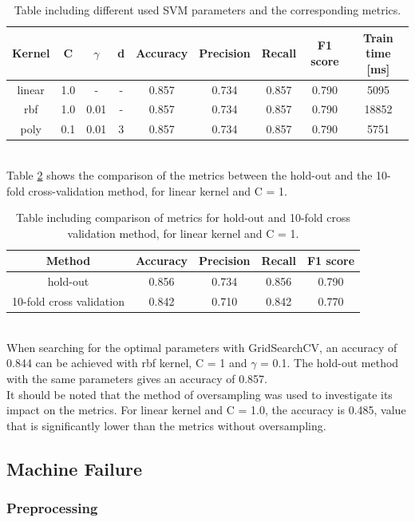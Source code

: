 \documentclass{article}
\begin{document}
\begin{table}[h!]
\centering
\begin{tabular}{||c c c c c c c c c||} 
 \hline
 Kernel & C & $\gamma$ &d & Accuracy & Precision & Recall & F1 score & Train time [ms] \\ [0.5ex] 
 \hline\hline
 linear &  1.0 & - & - & 0.857 & 0.734 & 0.857 & 0.790 & 5095 \\
  rbf &  1.0 & 0.01 & - & 0.857 & 0.734 & 0.857 & 0.790 & 18852\\
 poly &  0.1 & 0.01 & 3 & 0.857 & 0.734 & 0.857 & 0.790 & 5751 \\[1ex] 
 \hline
\end{tabular}
\caption{Table including different used SVM parameters and the corresponding metrics.}
\label{table:rta_SVM}
\end{table}
\\
Table \ref{table:rta_SVM_cross} shows the comparison of the metrics between the hold-out and the 10-fold cross-validation method, for linear kernel and C = 1.
\begin{table}[h!]
\centering
\begin{tabular}{||c c c c c||} 
 \hline
Method &  Accuracy & Precision & Recall & F1 score \\ [0.5ex] 
 \hline\hline
hold-out & 0.856 & 0.734 & 0.856 & 0.790  \\  
 10-fold cross validation &  0.842&  0.710 & 0.842& 0.770 \\ [1ex] 
 \hline
\end{tabular}
\caption{Table including comparison of metrics for hold-out and 10-fold cross validation method, for linear kernel and C = 1.}
\label{table:rta_SVM_cross}
\end{table}
\\ 
When searching for the optimal parameters with GridSearchCV, an accuracy of 0.844 can be achieved with rbf kernel, C = 1 and $\gamma$ = 0.1. The hold-out method with the same parameters gives an accuracy of 0.857. 
\\ It should be noted that the method of oversampling was used to investigate its impact on the metrics. For linear kernel and C = 1.0, the accuracy is 0.485, value that is significantly lower than the metrics without oversampling.   
\subsection{Machine Failure}
\subsubsection{Preprocessing}
\end{document}
